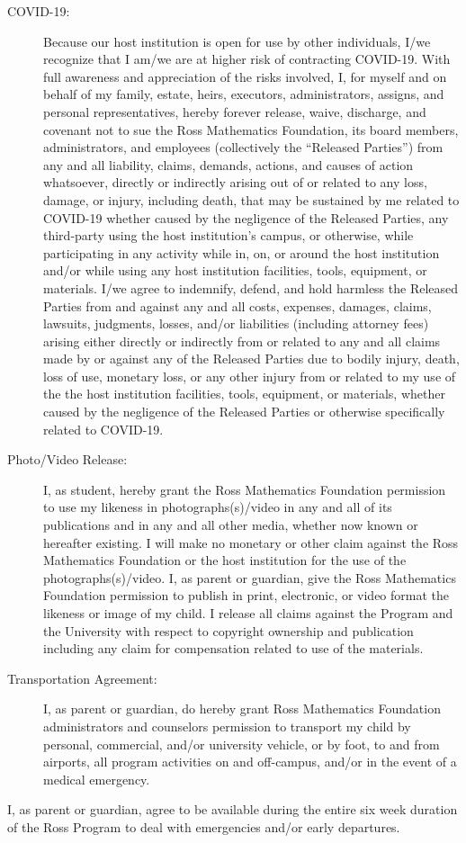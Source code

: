 \documentclass{ross}
\begin{document}
\begin{description}
  \item[COVID-19:] Because our host institution is open for use
by other individuals, I/we recognize that I am/we are at higher risk of 
contracting COVID-19. With full awareness and appreciation of
the risks involved, I, for myself and on behalf of my family, estate,
heirs, executors, administrators, assigns, and personal representatives, 
hereby forever release, waive, discharge, and covenant not to sue the 
Ross Mathematics Foundation, its board members, administrators, and 
employees (collectively the  ``Released Parties'') from any and all liability, 
claims, demands, actions, and causes of action whatsoever, directly or 
indirectly arising out of or related to any loss, damage, or injury, 
including death, that may be sustained by me related to COVID-19 whether
caused by the negligence of the Released Parties, any third-party using 
the host institution's campus, or otherwise, while participating in any activity while in, on, 
or around the host institution and/or while using any host institution facilities, tools, 
equipment, or materials. I/we agree to indemnify, defend, and hold 
harmless the Released Parties from and against any and all costs, expenses,
damages, claims, lawsuits, judgments, losses, and/or liabilities 
(including attorney fees) arising either directly or indirectly from or 
related to any and all claims made by or against any of the Released 
Parties due to bodily injury, death, loss of use, monetary loss, or 
any other injury from or related to my use of the the host institution facilities,
tools, equipment, or materials, whether caused by the negligence of 
the Released Parties or otherwise specifically related to COVID-19.
\item[Photo/Video Release:] I, as student, hereby grant the Ross
  Mathematics Foundation permission to use my likeness in
  photographs(s)/video in any and all of its publications and in any
  and all other media, whether now known or hereafter existing. I will
  make no monetary or other claim against the Ross Mathematics Foundation or
  the host institution for the use of the photographs(s)/video. I, as parent or
  guardian, give the Ross Mathematics Foundation permission to publish in
  print, electronic, or video format the likeness or image of my
  child. I release all claims against the Program and the University
  with respect to copyright ownership and publication including any
  claim for compensation related to use of the materials.
\item[Transportation Agreement:] I, as parent or guardian, do hereby
  grant Ross Mathematics Foundation administrators and counselors
  permission to transport my child by personal, commercial, and/or
  university vehicle, or by foot, to and from airports, all program
  activities on and off-campus, and/or in the event of a medical
  emergency.
\end{description}
I, as parent or guardian, agree to be available during the entire six
week duration of the Ross Program to deal with emergencies and/or early
departures.
\end{document}
